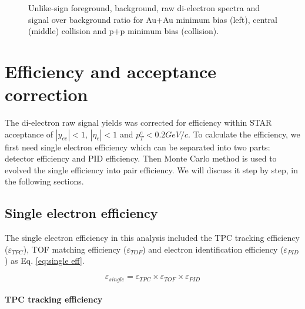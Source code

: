 \begin{lyxcode}
\begin{figure}
\begin{centering}
\begin{minipage}[t][1\totalheight][s]{0.33\columnwidth}
\begin{center}
\par\end{center}%
\end{minipage}
\par\end{centering}

\protect\caption{Unlike-sign foreground, background, raw di-electron spectra and signal
over background ratio for Au+Au minimum bias (left), central (middle)
collision and p+p minimum bias (collision). }


\label{fig:RYandSBratio}
\end{figure}

\end{lyxcode}

\section{Efficiency and acceptance correction}

The di-electron raw signal yields was corrected for efficiency within
STAR acceptance of $|y_{ee}|<1$, $|\eta_{e}|<1$ and $p_{T}^{e}<0.2GeV/c$.
To calculate the efficiency, we first need single electron efficiency
which can be separated into two parts: detector efficiency and PID
efficiency. Then Monte Carlo method is used to evolved the single
efficiency into pair efficiency. We will discuss it step by step,
in the following sections.


\subsection{Single electron efficiency}

The single electron efficiency in this analysis included the TPC tracking
efficiency ($\varepsilon_{TPC}$), TOF matching efficiency ($\varepsilon_{TOF}$)
and electron identification efficiency ($\varepsilon_{PID}$) as Eq.
\ref{eq:single eff}.

\begin{equation}
\varepsilon_{single}=\varepsilon_{TPC}\times\varepsilon_{TOF}\times\varepsilon_{PID}\label{eq:single eff}
\end{equation}



\paragraph{TPC tracking efficiency}

